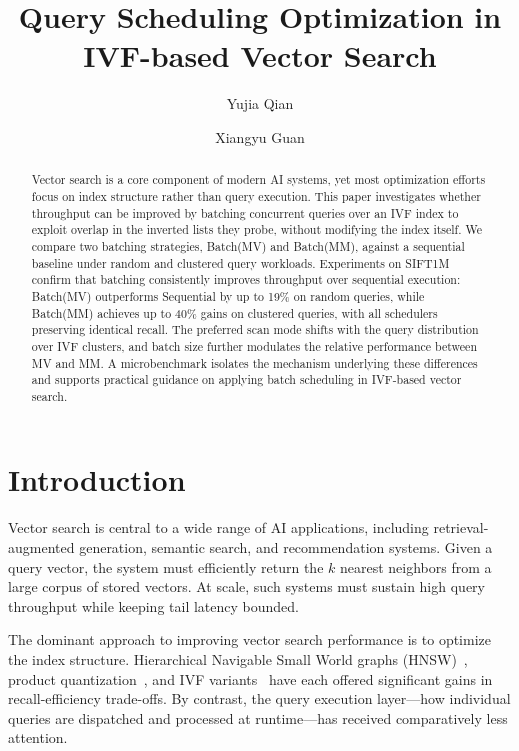 \documentclass[sigconf, nonacm]{acmart}
\title{Query Scheduling Optimization in IVF-based Vector Search}
\author{Yujia Qian}
\affiliation{%
  \institution{Harvard University}
  \city{Cambridge}
  \state{Massachusetts}
  \country{USA}
}
\author{Xiangyu Guan}
\affiliation{%
  \institution{Harvard University}
  \city{Cambridge}
  \state{Massachusetts}
  \country{USA}
}
\begin{document}
\begin{abstract}
Vector search is a core component of modern AI systems, yet most
optimization efforts focus on index structure rather than query
execution. This paper investigates whether throughput can be improved by
batching concurrent queries over an IVF index to exploit overlap in the
inverted lists they probe, without modifying the index itself. We
compare two batching strategies, Batch(MV) and Batch(MM), against a
sequential baseline under random and clustered query workloads.
Experiments on SIFT1M confirm that batching consistently improves
throughput over sequential execution: Batch(MV) outperforms Sequential
by up to 19\% on random queries, while Batch(MM) achieves up to 40\%
gains on clustered queries, with all schedulers preserving identical
recall. The preferred scan mode shifts with the query distribution over
IVF clusters, and batch size further modulates the relative performance
between MV and MM.
A microbenchmark isolates the mechanism underlying these differences and
supports practical guidance on applying batch scheduling in IVF-based
vector search.
\end{abstract}


\maketitle

\section{Introduction}

Vector search is central to a wide range of AI applications, including
retrieval-augmented generation, semantic search, and recommendation
systems. Given a query vector, the system must efficiently return the
$k$ nearest neighbors from a large corpus of stored vectors. At scale,
such systems must sustain high query throughput while keeping tail
latency bounded.

The dominant approach to improving vector search performance is to
optimize the index structure. Hierarchical Navigable Small World graphs
(HNSW)~\cite{hnsw2020}, product quantization~\cite{pq2011}, and IVF
variants~\cite{faiss2021} have each offered significant gains in
recall-efficiency trade-offs. By contrast, the query execution
layer---how individual queries are dispatched and processed at
runtime---has received comparatively less attention.
\end{document}
